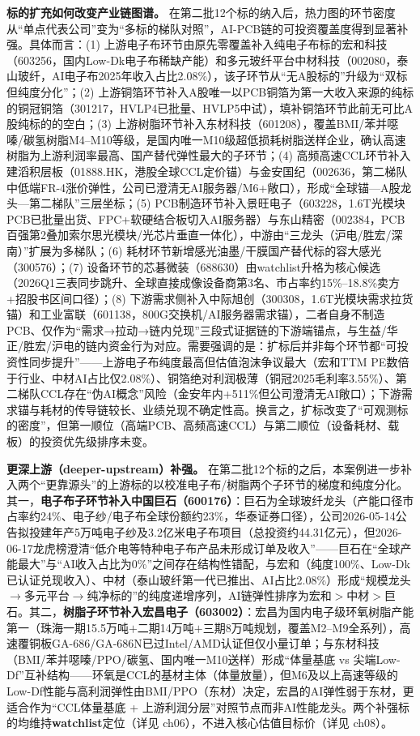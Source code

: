\textbf{标的扩充如何改变产业链图谱。} 在第二批12个标的纳入后，热力图的环节密度从“单点代表公司”变为“多标的梯队对照”，AI-PCB链的可投资覆盖度得到显著补强。具体而言：(1) 上游电子布环节由原先零覆盖补入纯电子布标的宏和科技（603256，国内Low-Dk电子布稀缺产能）和多元玻纤平台中材科技（002080，泰山玻纤，AI电子布2025年收入占比2.08\%），该子环节从“无A股标的”升级为“双标但纯度分化”；(2) 上游铜箔环节补入A股唯一以PCB铜箔为第一大收入来源的纯标的铜冠铜箔（301217，HVLP4已批量、HVLP5中试），填补铜箔环节此前无可比A股纯标的的空白；(3) 上游树脂环节补入东材科技（601208），覆盖BMI/苯并噁嗪/碳氢树脂M4–M10等级，是国内唯一M10级超低损耗树脂送样企业，确认高速树脂为上游利润率最高、国产替代弹性最大的子环节；(4) 高频高速CCL环节补入建滔积层板（01888.HK，港股全球CCL定价锚）与金安国纪（002636，第二梯队中低端FR-4涨价弹性，公司已澄清无AI服务器/M6+敞口），形成“全球锚—A股龙头—第二梯队”三层坐标；(5) PCB制造环节补入景旺电子（603228，1.6T光模块PCB已批量出货、FPC+软硬结合板切入AI服务器）与东山精密（002384，PCB百强第2叠加索尔思光模块/光芯片垂直一体化），中游由“三龙头（沪电/胜宏/深南）”扩展为多梯队；(6) 耗材环节新增感光油墨/干膜国产替代标的容大感光（300576）；(7) 设备环节的芯碁微装（688630）由watchlist升格为核心候选（2026Q1三表同步跳升、全球直接成像设备商第3名、市占率约15\%--18.8\%卖方+招股书区间口径）；(8) 下游需求侧补入中际旭创（300308，1.6T光模块需求拉货锚）和工业富联（601138，800G交换机/AI服务器需求锚），二者自身不制造PCB、仅作为“需求→拉动→链内兑现”三段式证据链的下游端锚点，与生益/华正/胜宏/沪电的链内资金行为对应。需要强调的是：扩标后并非每个环节都“可投资性同步提升”——上游电子布纯度最高但估值泡沫争议最大（宏和TTM PE数倍于行业、中材AI占比仅2.08\%）、铜箔绝对利润极薄（铜冠2025毛利率3.55\%）、第二梯队CCL存在“伪AI概念”风险（金安年内+511\%但公司澄清无AI敞口）；下游需求锚与耗材的传导链较长、业绩兑现不确定性高。换言之，扩标改变了“可观测标的密度”，但第一顺位（高端PCB、高频高速CCL）与第二顺位（设备耗材、载板）的投资优先级排序未变。

\textbf{更深上游（deeper-upstream）补强。} 在第二批12个标的之后，本案例进一步补入两个“更靠源头”的上游标的以校准电子布/树脂两个子环节的梯度和纯度分化。其一，\textbf{电子布子环节补入中国巨石（600176）}：巨石为全球玻纤龙头（产能口径市占率约24\%、电子纱/电子布全球份额约23\%，华泰证券口径），公司2026-05-14公告拟投建年产5万吨电子纱及3.2亿米电子布项目（总投资约44.31亿元），但2026-06-17龙虎榜澄清“低介电等特种电子布产品未形成订单及收入”——巨石在“全球产能最大”与“AI收入占比为0\%”之间存在结构性错配，与宏和（纯度100\%、Low-Dk已认证兑现收入）、中材（泰山玻纤第一代已推出、AI占比2.08\%）形成“规模龙头$\to$多元平台$\to$纯净标的”的纯度递增序列，AI链弹性排序为宏和$>$中材$>$巨石。其二，\textbf{树脂子环节补入宏昌电子（603002）}：宏昌为国内电子级环氧树脂产能第一（珠海一期15.5万吨$+$二期14万吨$+$三期8万吨规划，覆盖M2--M9全系列），高速覆铜板GA-686/GA-686N已过Intel/AMD认证但仅小量订单；与东材科技（BMI/苯并噁嗪/PPO/碳氢、国内唯一M10送样）形成“体量基底 vs 尖端Low-Df”互补结构——环氧是CCL的基材主体（体量放量），但M6及以上高速等级的Low-Df性能与高利润弹性由BMI/PPO（东材）决定，宏昌的AI弹性弱于东材，更适合作为“CCL体量基底 + 上游利润分层”对照节点而非AI性能龙头。两个补强标的均维持\textbf{watchlist}定位（详见 ch06），不进入核心估值目标价（详见 ch08）。

